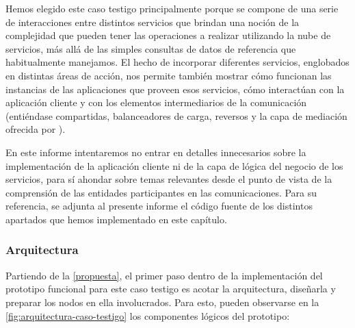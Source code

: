 Hemos elegido este caso testigo principalmente porque se compone de una serie de interacciones entre distintos servicios que brindan una noción de la complejidad que pueden tener las operaciones a realizar utilizando la nube de servicios, más allá de las simples consultas de datos de referencia que habitualmente manejamos. El hecho de incorporar diferentes servicios, englobados en distintas áreas de acción, nos permite también mostrar cómo funcionan las instancias de las aplicaciones que proveen esos servicios, cómo interactúan con la aplicación cliente y con los elementos intermediarios de la comunicación (entiéndase  compartidas, balanceadores de carga,  reversos y la capa de mediación ofrecida por ).

En este informe intentaremos no entrar en detalles innecesarios sobre la implementación de la aplicación cliente ni de la capa de lógica del negocio de los servicios, para sí ahondar sobre temas relevantes desde el punto de vista de la comprensión de las entidades participantes en las comunicaciones. Para su referencia, se adjunta al presente informe el código fuente de los distintos apartados que hemos implementado en este capítulo.


\subsubsection{Arquitectura}

Partiendo de la \autoref{propuesta}, el primer paso dentro de la implementación del prototipo funcional para este caso testigo es acotar la arquitectura, diseñarla y preparar los nodos en ella involucrados. Para esto, pueden observarse en la \autoref{fig:arquitectura-caso-testigo} los componentes lógicos del prototipo:

